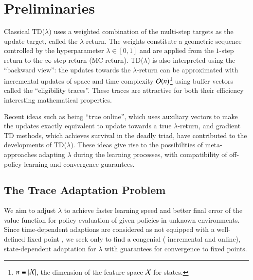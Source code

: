 \documentclass{article}
\begin{document}
\section{Preliminaries}\label{sec:preliminaries}
Classical TD($\lambda$) \cite{Singh1996} uses a weighted combination of the multi-step targets as the update target, called the $\lambda$-return. The weights constitute a geometric sequence controlled by the hyperparameter $\lambda \in [0, 1]$ and are applied from the $1$-step return to the $\infty$-step return (MC return). TD($\lambda$) is also interpreted using the ``backward view'': the updates towards the $\lambda$-return can be approximated with incremental updates of space and time complexity $\mathcal{O}(n)$\footnote{$n \equiv |\mathcal{X}|$, the dimension of the feature space $\mathcal{X}$ for states.} using buffer vectors called the ``eligibility traces''. These traces are attractive for both their efficiency interesting mathematical properties.
\par
Recent ideas such as being ``true online'', which uses auxiliary vectors to make the updates exactly equivalent to update towards a true $\lambda$-return, and gradient TD methods, which achieves survival in the deadly triad, have contributed to the developments of TD($\lambda$). These ideas give rise to the possibilities of meta-approaches adapting $\lambda$ during the learning processes, with compatibility of off-policy learning and convergence guarantees.

\subsection{The Trace Adaptation Problem}
We aim to adjust $\lambda$ to achieve faster learning speed and better final error of the value function for policy evaluation of given policies in unknown environments. Since time-dependent adaptions are considered as not equipped with a well-defined fixed point \cite{white2016greedy}, we seek only to find a congenial (\ie{} incremental and online), state-dependent adaptation for $\lambda$ with guarantees for convergence to fixed points.
\end{document}
